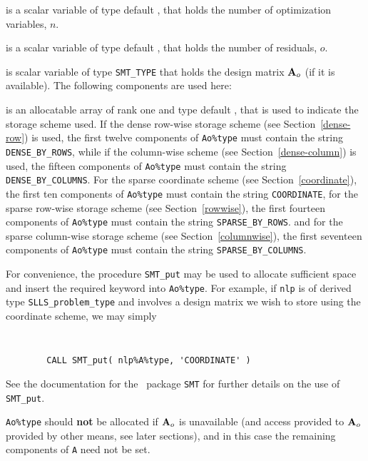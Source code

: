 \documentclass{galahad}
\newcommand{\packagename}{SLLS}
\begin{document}
\begin{description}

 is a scalar variable of type default \integer,
 that holds the number of optimization variables, $n$.

 is a scalar variable of type default \integer,
 that holds the number of residuals, $o$.

 is scalar variable of type {\tt SMT\_TYPE}
that holds the design matrix ${\mathbf{A}}_o$ (if it is available).
The following components are used here:

\begin{description}

 is an allocatable array of rank one and type default
\character, that
is used to indicate the storage scheme used. If the dense row-wise
storage scheme (see Section~\ref{dense-row}) is used,
the first twelve components of {\tt Ao\%type} must contain the
string {\tt DENSE\_BY\_ROWS}, while if the column-wise scheme
(see Section~\ref{dense-column}) is used,
the fifteen components of {\tt Ao\%type} must contain the
string {\tt DENSE\_BY\_COLUMNS}.
For the sparse coordinate scheme (see Section~\ref{coordinate}),
the first ten components of {\tt Ao\%type} must contain the
string {\tt COORDINATE},
for the sparse row-wise storage scheme (see Section~\ref{rowwise}),
the first fourteen components of {\tt Ao\%type} must contain the
string {\tt SPARSE\_BY\_ROWS}.
and for the sparse column-wise storage scheme (see Section~\ref{columnwise}),
the first seventeen components of {\tt Ao\%type} must contain the
string {\tt SPARSE\_BY\_COLUMNS}.

For convenience, the procedure {\tt SMT\_put}
may be used to allocate sufficient space and insert the required keyword
into {\tt Ao\%type}.
For example, if {\tt nlp} is of derived type {\tt \packagename\_problem\_type}
and involves a design matrix we wish to store using the coordinate scheme,
we may simply
{\tt
\begin{verbatim}
        CALL SMT_put( nlp%A%type, 'COORDINATE' )
\end{verbatim}
}
\noindent
See the documentation for the \galahad\ package {\tt SMT}
for further details on the use of {\tt SMT\_put}.

\noindent
{\tt Ao\%type} should {\bf not} be allocated if ${\mathbf{A}}_o$ is unavailable
(and access provided to  ${\mathbf{A}}_o$ provided by other means, see later sections), 
and in this case the remaining components of {\tt A} need not be set.


\end{description}
\end{description}
\end{document}
